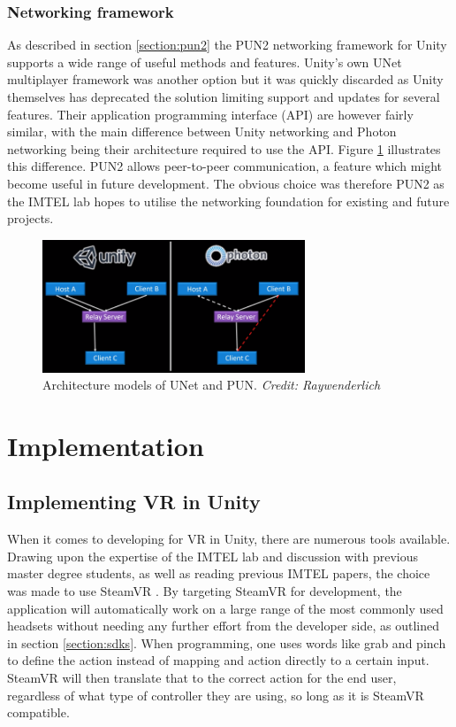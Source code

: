 \subsubsection{Networking framework}
As described in section \ref{section:pun2} the PUN2 networking framework for Unity supports a wide range of useful methods and features. Unity's own UNet multiplayer framework  was another option but it was quickly discarded as Unity themselves has deprecated the solution limiting support and updates for several features. Their application programming interface (API) are however fairly similar, with the main difference between Unity networking and Photon networking being their architecture required to use the API. Figure \ref{fig:phase1_unetVSpun} illustrates this difference. PUN2 allows peer-to-peer communication, a feature which might become useful in future development.  
The obvious choice was therefore PUN2 as the IMTEL lab hopes to utilise the networking foundation for existing and future projects.   

\begin{figure}[]
  \centering
    \captionsetup{width=.7\linewidth}
    \includegraphics[width=0.7\textwidth]{fig/phase_1/punVSunet.png}
 \caption{Architecture models of UNet and PUN. \textit{Credit: Raywenderlich}}
\label{fig:phase1_unetVSpun}
\end{figure}



\section{Implementation}

\subsection{Implementing VR in Unity}
When it comes to developing for VR in Unity, there are numerous tools available. Drawing upon the expertise of the IMTEL lab and discussion with previous master degree students, as well as reading previous IMTEL papers, the choice was made to use SteamVR \cite{steamVR}\cite{steamVRAPI}. By targeting SteamVR for development, the application will automatically work on a large range of the most commonly used headsets without needing any further effort from the developer side, as outlined in section \ref{section:sdks}. When programming, one uses words like grab and pinch to define the action instead of mapping and action directly to a certain input. SteamVR will then translate that to the correct action for the end user, regardless of what type of controller they are using, so long as it is SteamVR compatible.

